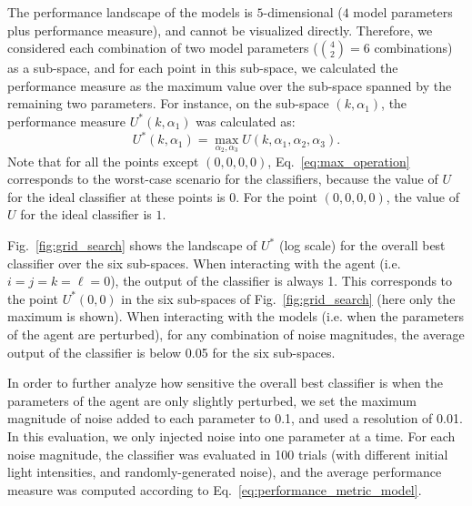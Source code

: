 The performance landscape of the models is $5$-dimensional ($4$ model parameters plus performance measure), and cannot be visualized directly. Therefore, we considered each combination of two model parameters ($\binom{4}{2}=6$ combinations) as a sub-space, and for each point in this sub-space, we calculated the performance measure as the maximum value over the sub-space spanned by the remaining two parameters. For instance, on the sub-space $\left(k, \alpha_1\right)$, the performance measure $U^{*}\left(k, \alpha_1\right)$ was calculated as:
\begin{equation}
U^{*}\left(k, \alpha_1\right) = \max_{\alpha_2,\alpha_3} 
U\left(k, \alpha_1, \alpha_2, \alpha_3\right).
\label{eq:max_operation}
\end{equation}
Note that for all the points except $(0,0,0,0)$, Eq.~\ref{eq:max_operation} corresponds to the worst-case scenario for the classifiers, because the value of $U$ for the ideal classifier at these points is $0$. For the point $(0,0,0,0)$, the value of $U$ for the ideal classifier is $1$. 

Fig.~\ref{fig:grid_search} shows the landscape of $U^{*}$ (log scale) for the overall best classifier over the six sub-spaces.
When interacting with the agent (i.e. $i=j=k=\ell=0$), the output of the classifier is always 1. This corresponds to the point $U^{*}(0,0)$ in the six sub-spaces of Fig.~\ref{fig:grid_search} (here only the maximum is shown). When interacting with the models (i.e. when the parameters of the agent are perturbed), for any combination of noise magnitudes, the average output of the classifier is
below 0.05 for the six sub-spaces. 

In order to further analyze how sensitive the overall best classifier is when the parameters of the agent are only slightly perturbed, we set the maximum magnitude of noise added to each parameter to 0.1, and used a resolution of 0.01. In this evaluation, we only injected noise into one parameter at a time. For each noise magnitude, the classifier was evaluated in 100 trials (with different initial light intensities, and randomly-generated noise), and the average performance measure was computed according to Eq.~\ref{eq:performance_metric_model}. 

